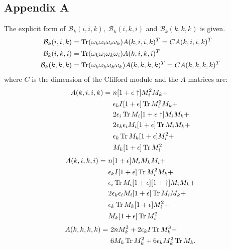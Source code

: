 \documentclass[12pt,a4paper]{article}
\DeclareMathOperator{\Tr}{Tr}
\begin{document}
\subsection{Appendix A}
The explicit form of $\mathcal{B}_k(i,i,k), \ \mathcal{B}_k(i,k,i)$ and $\mathcal{B}_k(k,k,k)$ is given.
\begin{align}
\mathcal{B}_k(i,i,k) &= \Tr(\omega_k \omega_i \omega_i \omega_k)A(k, i, i, k)^T = CA(k,i,i,k)^T \\ \notag
\mathcal{B}_k(i,k,i) &= \Tr(\omega_k \omega_i \omega_k \omega_i)A(k, i, k, i)^T \\ \notag
\mathcal{B}_k(k,k,k) &= \Tr(\omega_k \omega_k \omega_k \omega_k)A(k, k, k, k)^T = CA(k,k,k,k)^T
\end{align}
where $C$ is the dimension of the Clifford module and the $A$ matrices are:
\begin{align}
A(k,i,i,k) = \ &n [1+\epsilon \ \dagger] M_i^2 M_k + \notag \\
&\epsilon_k I [1 + \epsilon] \Tr M_i^2 M_k + \notag \\
&2\epsilon_i \Tr M_i [1 + \epsilon \ \dagger] M_i M_k + \notag \\
&2\epsilon_k \epsilon_i M_i [1 + \epsilon] \Tr M_i M_k + \notag \\
&\epsilon_k \Tr M_k [1 + \epsilon] M_i^2 + \notag \\
&M_k [1 + \epsilon] \Tr M_i^2
\end{align}
\begin{align}
A(k,i,k,i) = \ &n [1+\epsilon] M_i M_k M_i + \notag \\
&\epsilon_k I [1 + \epsilon] \Tr M_i^2 M_k + \notag \\
&\epsilon_i \Tr M_i [1 + \epsilon][1+\dagger] M_i M_k + \notag \\
&2\epsilon_k \epsilon_i M_i [1 + \epsilon] \Tr M_i M_k + \notag \\
&\epsilon_k \Tr M_k [1 + \epsilon] M_i^2 + \notag \\
&M_k [1 + \epsilon] \Tr M_i^2
\end{align}
\begin{align}
A(k,k,k,k) = \ &2n M_k^3 + 2\epsilon_k I \Tr M_k^3 + \notag \\
&6 M_k \Tr M_k^2 + 6\epsilon_k M_k^2 \Tr M_k.
\end{align}
\end{document}
